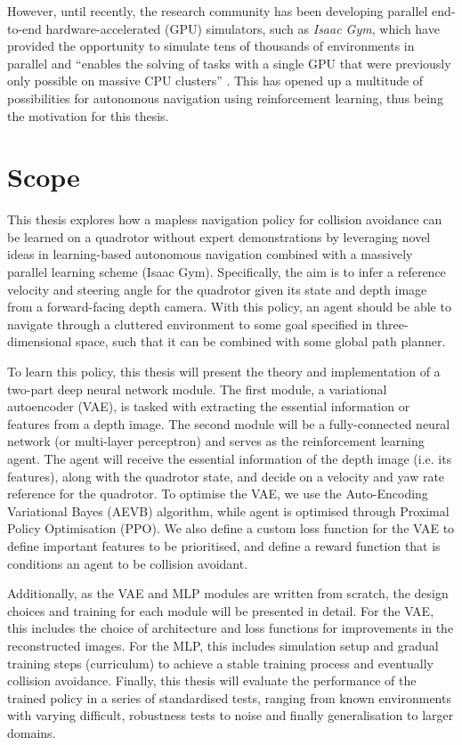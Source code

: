 However, until recently, the research community has been developing parallel end-to-end hardware-accelerated (GPU) simulators, such as \textit{Isaac Gym}, which have provided the opportunity to simulate tens of thousands of environments in parallel and ``enables the solving of tasks with a single GPU that were previously only possible on massive CPU clusters'' \cite{IsaacGym}. This has opened up a multitude of possibilities for autonomous navigation using reinforcement learning, thus being the motivation for this thesis.


\section{Scope}
This thesis explores how a mapless navigation policy for collision avoidance can be learned on a quadrotor without expert demonstrations by leveraging novel ideas in learning-based autonomous navigation combined with a massively parallel learning scheme (Isaac Gym). 
Specifically, the aim is to infer a reference velocity and steering angle for the quadrotor given its state and depth image from a forward-facing depth camera. With this policy, an agent should be able to navigate through a cluttered environment to some goal specified in three-dimensional space, such that it can be combined with some global path planner.

To learn this policy, this thesis will present the theory and implementation of a two-part deep neural network module. The first module, a variational autoencoder (VAE), is tasked with extracting the essential information or features from a depth image. The second module will be a fully-connected neural network (or multi-layer perceptron) and serves as the reinforcement learning agent. The agent will receive the essential information of the depth image (i.e. its features), along with the quadrotor state, and decide on a velocity and yaw rate reference for the quadrotor. To optimise the VAE, we use the Auto-Encoding Variational Bayes (AEVB) algorithm, while agent is optimised through Proximal Policy Optimisation (PPO). We also define a custom loss function for the VAE to define important features to be prioritised, and define a reward function that is conditions an agent to be collision avoidant.

Additionally, as the VAE and MLP modules are written from scratch, the design choices and training for each module will be presented in detail. 
For the VAE, this includes the choice of architecture and loss functions for improvements in the reconstructed images.
For the MLP, this includes simulation setup and gradual training steps (curriculum) to achieve a stable training process and eventually collision avoidance.
Finally, this thesis will evaluate the performance of the trained policy in a series of standardised tests, ranging from known environments with varying difficult, robustness tests to noise and finally generalisation to larger domains. 

